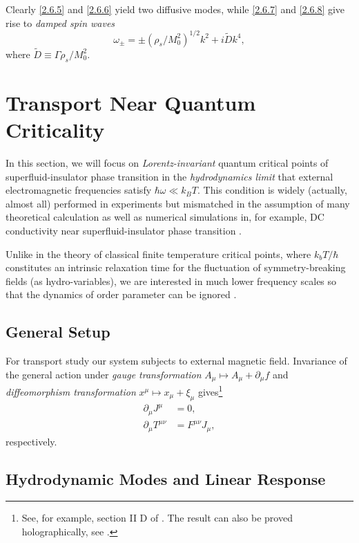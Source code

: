 \documentclass[10pt,nofootinbib,letterpaper]{revtex4}
\begin{document}
		Clearly \eqref{2.6.5} and \eqref{2.6.6} yield two diffusive modes, while \eqref{2.6.7} and \eqref{2.6.8} give rise to \emph{damped spin waves}
		\begin{equation}\label{2.6.9}
			\omega_\pm=\pm(\rho_s/M_0^2)^{1/2}k^2+i \widetilde{D}k^4, 
		\end{equation}
		where $\widetilde{D}\equiv\Gamma\rho_s/M_0^2$.

\section{Transport Near Quantum Criticality}
	In this section, we will focus on \emph{Lorentz-invariant} quantum critical points of superfluid-insulator phase transition in the \emph{hydrodynamics limit} that external electromagnetic frequencies satisfy $\hbar\omega\ll k_B T$. This condition is widely (actually, almost all) performed in experiments but mismatched in the assumption of many theoretical calculation as well as numerical simulations in, for example, DC conductivity near superfluid-insulator phase transition \cite{damle1997nonzero}.\par
	Unlike in the theory of classical finite temperature critical points, where $k_bT/\hbar$ constitutes an intrinsic relaxation time for the fluctuation of symmetry-breaking fields (as hydro-variables), we are interested in much lower frequency scales so that the dynamics of order parameter can be ignored \cite{hartnoll2007theory}.

	\subsection{General Setup}

		For transport study our system subjects to external magnetic field. Invariance of the general action under \emph{gauge transformation} $A_\mu\mapsto A_\mu+\partial_\mu f$ and \emph{diffeomorphism transformation} $x^\mu\mapsto x_\mu+\xi_\mu$ gives\footnote{See, for example, section II D of \cite{herzog2009lectures}. The result can also be proved holographically, see \cite{lindgren2015holographic}.}
		\begin{align}\label{5.1.1}
			\partial_\mu J^\mu&=0,\\
			\partial_\mu T^{\mu\nu}&=F^{\mu\nu}J_\mu,
		\end{align}
		respectively.
		
	\subsection{Hydrodynamic Modes and Linear Response}
\end{document}
